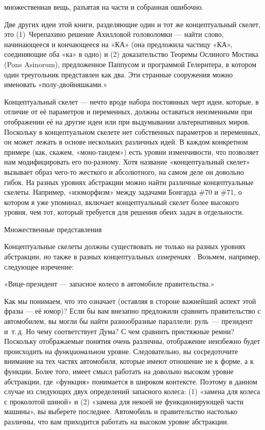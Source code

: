 \documentclass[../main.tex]{subfiles}
\begin{document}
множественная вещь, разъятая на части и собранная ошибочно.

Две других идеи этой книги, разделяющие один и тот же концептуальный скелет, это (1)~Черепахино решение Ахилловой головоломки --- найти слово, начинающееся и кончающееся на «КА» (она предложила частицу «КА», соединяющие оба «ка» в одно) и (2) доказательство Теоремы Ослиного Мостика (Pons Asinorum), предложенное Паппусом и программой Гелернтера, в котором один треугольник представлен как два. Эти странные сооружения можно именовать «полу-двойняшками.»

Концептуальный скелет --- нечто вроде набора постоянных черт идеи, которые, в отличие от её параметров и переменных, должны оставаться неизменными при отображении её на другие идеи или при выдумывании альтернативных миров. Поскольку в концептуальном скелете нет собственных параметров и переменных, он может лежать в основе нескольких различных идей. В каждом конкретном примере (как, скажем, «моно-тандем») есть уровни изменчивости, что позволяет нам модифицировать его по-разному. Хотя название «концептуальный скелет» вызывает образ чего-то жесткого и абсолютного, на самом деле он довольно гибок. На разных уровнях абстракции можно найти различные концептуальные скелеты. Например, «изоморфизм» между задачами Бонгарда \#70 и \#71, о котором я уже упоминал, включает концептуальный скелет более высокого уровня, чем тот, который требуется для решения обеих задач в отдельности.

Множественные представления

Концептуальные скелеты должны существовать не только на разных уровнях абстракции, но также в разных концептуальных \emph{измерениях} . Возьмем, например, следующее изречение:

«Вице-президент --- запасное колесо в автомобиле правительства.»

Как мы понимаем, что это означает (оставляя в стороне важнейший аспект этой фразы --- её юмор)? Если бы вам внезапно предложили сравнить правительство с автомобилем, вы могли бы найти разнообразные параллели: руль~--- президент и~т.\,д. Но чему соответствует Дума? С чем сравнить пристяжные ремни? Поскольку отображаемые понятия очень различны, отображение неизбежно будет происходить на \emph{функциональном} уровне. Следовательно, вы сосредоточите внимание на тех частях автомобиля, которые имеют отношение не к форме, а к функции. Более того, имеет смысл работать на довольно высоком уровне абстракции, где «функция» понимается в широком контексте. Поэтому в данном случае из следующих двух определений запасного колеса: (1) «замена для колеса с проколотой шиной» и (2) «замена для некоей не функционирующей части машины», вы выберете последнее. Автомобиль и правительство настолько различны, что вам приходится работать на высоком уровне абстракции.
\end{document}
